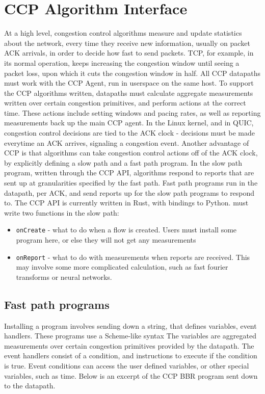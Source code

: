 \section{CCP Algorithm Interface}
At a high level, congestion control algorithms measure and update statistics about the network, every time they receive new information, usually on packet ACK arrivals, in order to decide how fast to send packets. TCP, for example, in its normal operation, keeps increasing the congestion window until seeing a packet loss, upon which it cuts the congestion window in half.
All CCP datapaths must work with the CCP Agent, run in userspace on the same host.
To support the CCP algorithms written, datapaths must calculate aggregate measurements written over certain congestion primitives, and perform actions at the correct time. These actions include setting windows and pacing rates, as well as reporting measurements back up the main CCP agent.
In the Linux kernel, and in QUIC, congestion control decisions are tied to the ACK clock - decisions must be made everytime an ACK arrives, signaling a congestion event.
Another advantage of CCP is that algorithms can take congestion control actions off of the ACK clock, by explicitly defining a slow path and a fast path program.
In the slow path program, written through the CCP API, algorithms respond to reports that are sent up at granularities specified by the fast path.
Fast path programs run in the datapath, per ACK, and send reports up for the slow path programs to respond to.
The CCP API is currently written in Rust, with bindings to Python.  must write two functions in the slow path:
  \begin{itemize}
    \item \texttt{onCreate} - what to do when a flow is created. Users must install some program here, or else they will not get any measurements
    \item \texttt{onReport} - what to do with measurements when reports are received. This may involve some more complicated calculation, such as fast fourier transforms or neural networks.
  \end{itemize}

\subsection{Fast path programs}
Installing a program involves sending down a string, that defines variables, event handlers. These programs use a Scheme-like syntax The variables are aggregated measurements over certain congestion primitives provided by the datapath. The event handlers consist of a condition, and instructions to execute if the condition is true. Event conditions can access the user defined variables, or other special variables, such as time.
Below is an excerpt of the CCP BBR program sent down to the datapath.

